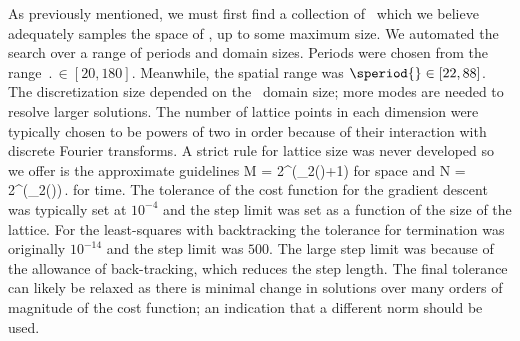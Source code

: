 As previously mentioned, we must first find a collection of \twots\ which we believe
adequately samples the space of \twots, up to some maximum size. We automated the search over a range
of periods and domain sizes. Periods were chosen from the range
$\period{}\in [20, 180]$. Meanwhile, the spatial range was $\speriod{} \in [22, 88]$. The discretization size
depended on the \spt\ domain size; more modes are needed to resolve larger solutions. The number
of lattice points in each dimension were typically chosen to be powers of two in order because of their interaction with discrete Fourier transforms. A strict rule for lattice size
was never developed so we offer is the approximate guidelines
\beq
M = 2^{(\log_2(\speriod{})+1)}
\eeq
for space and
\beq
N = 2^{(\log_2(\period{}))}\,.
\eeq
for time.
The tolerance of the cost function for the gradient descent was typically set at $10^{-4}$
and the step limit was set as a function of the size of the lattice. For the least-squares
with backtracking the tolerance for termination was originally $10^{-14}$ and the step limit was $500$. The large step limit was because of
the allowance of back-tracking, which reduces the step length.
The final tolerance can likely be relaxed as there is minimal change in solutions over many orders
of magnitude of the cost function; an indication that a different norm should be used.
